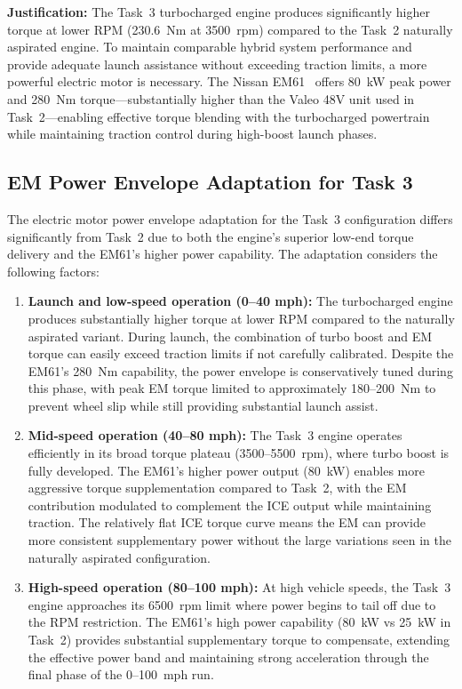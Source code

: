 \textbf{Justification:} The Task~3 turbocharged engine produces significantly higher torque at lower RPM (230.6~Nm at 3500~rpm) compared to the Task~2 naturally aspirated engine. To maintain comparable hybrid system performance and provide adequate launch assistance without exceeding traction limits, a more powerful electric motor is necessary. The Nissan EM61~\cite{nissan_leaf_motor, nissan_em61_specs} offers 80~kW peak power and 280~Nm torque—substantially higher than the Valeo 48V unit used in Task~2—enabling effective torque blending with the turbocharged powertrain while maintaining traction control during high-boost launch phases.

\subsection{EM Power Envelope Adaptation for Task 3}

The electric motor power envelope adaptation for the Task~3 configuration differs significantly from Task~2 due to both the engine's superior low-end torque delivery and the EM61's higher power capability. The adaptation considers the following factors:

\begin{enumerate}
    \item \textbf{Launch and low-speed operation (0--40 mph):} The turbocharged engine produces substantially higher torque at lower RPM compared to the naturally aspirated variant. During launch, the combination of turbo boost and EM torque can easily exceed traction limits if not carefully calibrated. Despite the EM61's 280~Nm capability, the power envelope is conservatively tuned during this phase, with peak EM torque limited to approximately 180--200~Nm to prevent wheel slip while still providing substantial launch assist.

    \item \textbf{Mid-speed operation (40--80 mph):} The Task~3 engine operates efficiently in its broad torque plateau (3500--5500~rpm), where turbo boost is fully developed. The EM61's higher power output (80~kW) enables more aggressive torque supplementation compared to Task~2, with the EM contribution modulated to complement the ICE output while maintaining traction. The relatively flat ICE torque curve means the EM can provide more consistent supplementary power without the large variations seen in the naturally aspirated configuration.

    \item \textbf{High-speed operation (80--100 mph):} At high vehicle speeds, the Task~3 engine approaches its 6500~rpm limit where power begins to tail off due to the RPM restriction. The EM61's high power capability (80~kW vs 25~kW in Task~2) provides substantial supplementary torque to compensate, extending the effective power band and maintaining strong acceleration through the final phase of the 0--100~mph run.
\end{enumerate}

